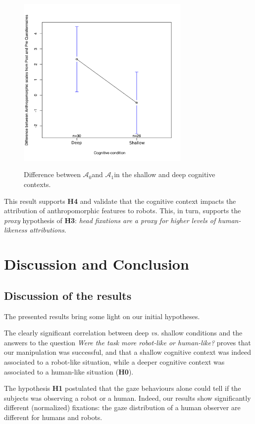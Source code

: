 \documentclass[lettersize, noapacite, twoside, HRI]{apa_HRI}
\newcommand{\vs}{\textit{vs.}\xspace}
\newcommand{\h}[1]{\textbf{H#1}\xspace}
\newcommand{\anti}{{$\mathcal{A}_0$\xspace}}
\newcommand{\antf}{{$\mathcal{A}_1$\xspace}}
\begin{document}
\begin{figure}
    \centering
    \includegraphics[width=3.3in]{H4}\label{ICAtoAAPImprovement}
    \caption{Difference between \anti and \antf in the shallow and deep
    cognitive contexts.}
    \label{h4}
\end{figure}

This result supports \h{4} and validate that the cognitive context impacts the
attribution of anthropomorphic features to robots. This, in turn, supports the
\emph{proxy} hypothesis of \h{3}: \emph{head fixations are a proxy for higher
levels of human-likeness attributions}.


\section{Discussion and Conclusion}

\subsection{Discussion of the results}

The presented results bring some light on our initial hypotheses.

The clearly significant correlation between deep \vs shallow conditions and the
answers to the question \emph{Were the task more robot-like or human-like?}
proves that our manipulation was successful, and that a shallow cognitive
context was indeed associated to a robot-like situation, while a deeper
cognitive context was associated to a human-like situation (\h{0}).

The hypothesis \h{1} postulated that the gaze behaviours alone could tell if the
subjects was observing a robot or a human. Indeed, our results show
significantly different (normalized) fixations: the gaze distribution of a human
observer are different for humans and robots.
\end{document}
